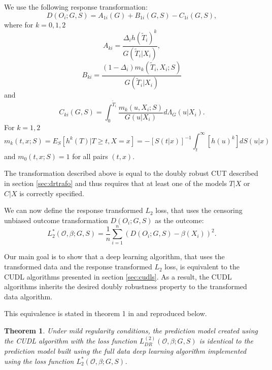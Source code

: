 \documentclass[12pt, a4paper]{article}
\theoremstyle{definition}
\theoremstyle{plain}
\newtheorem{Theorem}{Theorem}[section]
\numberwithin{equation}{section}
\numberwithin{figure}{section}
\numberwithin{table}{section}
\begin{document}
	We use the following response transformation:
	\begin{equation*}
	D(O_i; G,S) = A_{1i}(G)+B_{1i}(G,S) - C_{1i}(G,S),
	\end{equation*}
	where for $k=0,1,2$
	\begin{equation*}
	A_{ki} = \frac{\Delta_i h(\tilde{T}_i)^k}{G(\tilde{T}_i\vert X_i)},
	\end{equation*}
	\begin{equation*}
	B_{ki} = \frac{(1-\Delta_i)m_k(\tilde{T}_i, X_i; S)}{G(\tilde{T}_i\vert X_i)}
	\end{equation*}
	and
	\begin{equation*}
	C_{ki} (G,S) = \int_{0}^{\tilde{T}_i} \frac{m_k(u, X_i; S)}{G(u \vert X_i)}d\Lambda_G(u \vert X_i).
	\end{equation*}
	For $k=1,2$
	\begin{equation}\label{eq:condexp}
	m_k(t,x;S) = E_S[h^k(T) \vert T \geq t, X = x] = -[S(t\vert x)]^{-1} \int_{t}^{\infty}[h(u)^k]dS(u\vert x)
	\end{equation}
	and $m_0(t,x;S) = 1$ for all pairs $(t,x)$.
	
	The transformation described above is equal to the doubly robust CUT described in section \ref{sec:drtrafo} and thus requires that at least one of the models $T\vert X$ or $C \vert X$ is correctly specified.
	
	We can now define the response transformed $L_2$ loss, that uses the censoring unbiased outcome transformation $D(O_i;G,S)$ as the outcome:
	\begin{equation*}
	L_2^*(\mathcal{O}, \beta; G,S) = \frac{1}{n} \sum_{i=1}^n (D(O_i;G,S)-\beta(X_i))^2.
	\end{equation*}
	
	Our main goal is to show that a deep learning algorithm, that uses the transformed data and the response transformed $L_2$ loss, is equivalent to the CUDL algorithms presented in section \ref{sec:cudls}.
	As a result, the CUDL algorithms inherits the desired doubly robustness property to the transformed data algorithm.
	
	This equivalence is stated in theorem 1 in \citet*{basearticle} and reproduced below.
	
	\begin{Theorem}\label{thm:equi}
		Under mild regularity conditions, the prediction model created using the CUDL algorithm with the loss function $L_{DR}^{(2)}(\mathcal{O}, \beta; G,S)$ is identical to the prediction model built using the full data deep learning algorithm implemented using the loss function $L_2^*(\mathcal{O}, \beta; G,S)$.
	\end{Theorem}
	
\end{document}
